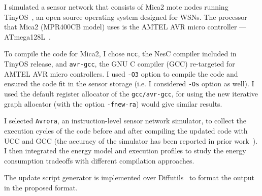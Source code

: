 I simulated a sensor network that consists of Mica2 mote nodes
\cite{mica2-power} running TinyOS~\cite{tinyos},  an open source
operating system designed for WSNs.  The processor that Mica2
(MPR400CB model) uses is the AMTEL AVR micro controller ---
ATmega128L~\cite{atmega128L}.  

To compile the code for Mica2, I chose {\tt ncc}, the NesC compiler
included in TinyOS release, and {\tt avr-gcc}, the GNU C compiler
(GCC) re-targeted for AMTEL AVR micro controllers. I used {\tt -O3}
option to compile the code and ensured the code fit in the sensor
storage (i.e. I considered {\tt -Os} option as well).  I used the
default register allocator of the {\tt gcc/avr-gcc}, for using the new
iterative graph allocator (with the option {\tt -fnew-ra}) would give
similar results.

I selected {\tt Avrora}, an instruction-level sensor network
simulator, to collect the execution cycles of the code before and
after compiling the updated code with UCC and GCC (the accuracy of the
simulator has been reported in prior work~\cite{avrora}). I then
integrated the energy model and execution profiles to study the energy
consumption tradeoffs with different compilation approaches.

The update script generator is implemented over Diffutils~\cite{diff}
to format the output in the proposed format.



